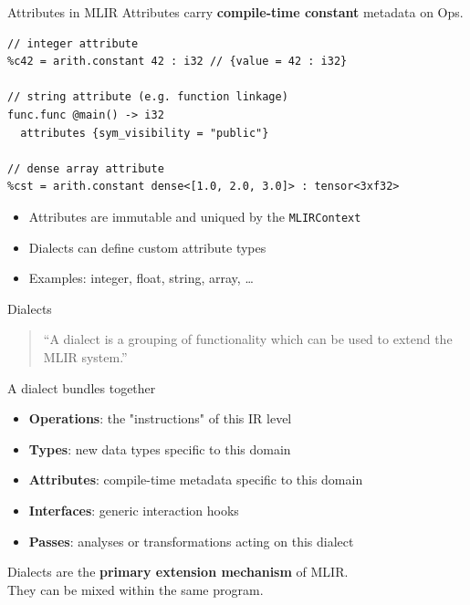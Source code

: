 \begin{frame}[fragile]{Attributes in MLIR}
  Attributes carry \textbf{\textcolor{mainAccent}{compile-time constant}} metadata on Ops.

\begin{lstlisting}[language=none,basicstyle=\ttfamily\small]
// integer attribute
%c42 = arith.constant 42 : i32 // {value = 42 : i32}

// string attribute (e.g. function linkage)
func.func @main() -> i32
  attributes {sym_visibility = "public"}

// dense array attribute
%cst = arith.constant dense<[1.0, 2.0, 3.0]> : tensor<3xf32>
\end{lstlisting}

  \begin{itemize}
    \item Attributes are immutable and uniqued by the \texttt{MLIRContext}
    \item Dialects can define custom attribute types
    \item Examples: integer, float, string, array, \ldots
  \end{itemize}
\end{frame}


\begin{frame}{Dialects}
  \begin{quote}
    ``A dialect is a grouping of functionality which can be used to extend the
    MLIR system.''
  \end{quote}

  \begin{block}{A dialect bundles together}
    \begin{itemize}
      \item \textbf{Operations}: the "instructions" of this IR level
      \item \textbf{Types}: new data types specific to this domain
      \item \textbf{Attributes}: compile-time metadata specific to this domain
      \item \textbf{Interfaces}: generic interaction hooks
      \item \textbf{Passes}: analyses or transformations acting on this dialect
    \end{itemize}
  \end{block}

  \bigskip
  Dialects are the \textbf{\textcolor{mainAccent}{primary extension mechanism}} of MLIR.\\
  They can be mixed within the same program.
\end{frame}


